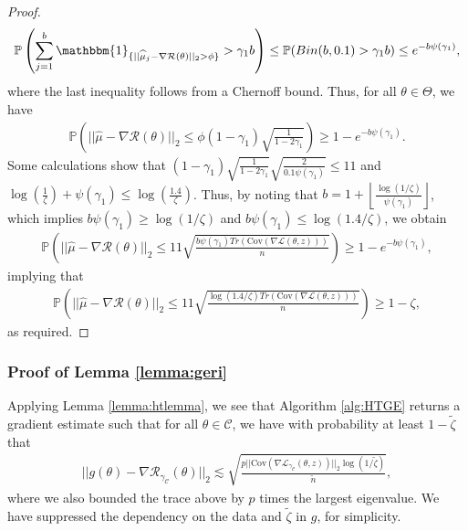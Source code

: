 \documentclass{article}
\begin{document}
\begin{proof}
\begin{align*}
\mathbb{P}\left(\sum_{j = 1}^b \mathbbm{1}_{\{||\widehat{\mu}_j - \nabla\mathcal{R}(\theta)||_2 > \phi\}} > \gamma_1 b\right) \leq \mathbb{P}(Bin(b, 0.1) > \gamma_1 b) \leq e^{-b\psi(\gamma_1)},
\end{align*}
where the last inequality follows from a Chernoff bound. Thus, for all $\theta \in \Theta$, we have
\begin{align*}
\mathbb{P}\left(||\widehat{\mu} - \nabla\mathcal{R}(\theta)||_2 \leq \phi(1 - \gamma_1)\sqrt{\frac{1}{1 - 2\gamma_1}}\right) \geq 1 - e^{-b\psi(\gamma_1)}.
\end{align*}
Some calculations show that $(1 - \gamma_1)\sqrt{\frac{1}{1 - 2\gamma_1}}\sqrt{\frac{2}{0.1\psi(\gamma_1)}} \leq 11$ and $\log(\frac{1}{\zeta}) + \psi(\gamma_1) \leq \log(\frac{1.4}{\zeta})$. Thus, by noting that $b = 1 + \left\lfloor \frac{\log(1/\zeta)}{\psi(\gamma_1)} \right\rfloor$, which implies $b\psi(\gamma_1) \geq \log(1/\zeta)$ and $b\psi(\gamma_1) \leq \log(1.4/\zeta)$, we obtain
\begin{align*}
\mathbb{P}\left(||\widehat{\mu} - \nabla\mathcal{R}(\theta)||_2 \leq 11\sqrt{\frac{b\psi(\gamma_1)Tr(\mathrm{\mathrm{Cov}}(\nabla \mathcal{L}(\theta, z)))}{n}}\right) \geq 1 - e^{-b\psi(\gamma_1)},
\end{align*}
implying that
\begin{align*}
\mathbb{P}\left(||\widehat{\mu} - \nabla\mathcal{R}(\theta)||_2 \leq 11\sqrt{\frac{\log(1.4/\zeta)Tr(\mathrm{\mathrm{Cov}}(\nabla \mathcal{L}(\theta, z)))}{n}}\right) \geq 1 - \zeta,
\end{align*}
as required.
\end{proof}


\subsubsection{Proof of Lemma \ref{lemma:geri}}
\label{AppLemGeri}

Applying Lemma \ref{lemma:htlemma}, we see that Algorithm \ref{alg:HTGE} returns a gradient estimate such that for all $\theta \in \mathcal{C}$, we have with probability at least $1 - \widetilde{\zeta}$ that
\begin{align}
\label{EqnGradErr}
||g(\theta) - \nabla\mathcal{R}_{\gamma_{\mathcal{C}}}(\theta)||_2 \lesssim \sqrt{\frac{p||\mathrm{\mathrm{Cov}}(\nabla \mathcal{L}_{\gamma_{\mathcal{C}}}(\theta, z))||_2\log(1/ \widetilde{\zeta})}{\widetilde{n}}},
\end{align}
where we also bounded the trace above by $p$ times the largest eigenvalue. We have suppressed the dependency on the data and $\widetilde{\zeta}$ in $g$, for simplicity.
\end{document}
